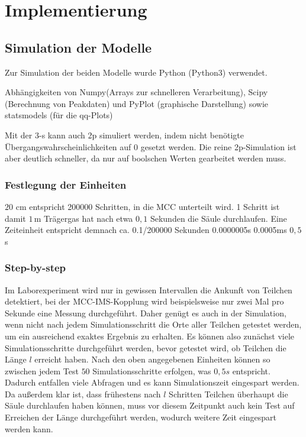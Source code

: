 
\chapter{Implementierung}
\label{chapter:imp}

\section{Simulation der Modelle}
Zur Simulation der beiden Modelle wurde Python (Python3) verwendet.

Abhängigkeiten von Numpy(Arrays zur schnelleren Verarbeitung), Scipy (Berechnung von Peakdaten) und PyPlot (graphische Darstellung) sowie statsmodels (für die qq-Plots)

Mit der 3-s kann auch 2p simuliert werden, indem nicht benötigte Übergangswahrscheinlichkeiten auf 0 gesetzt werden. Die reine 2p-Simulation ist aber deutlich schneller, da nur auf boolschen Werten gearbeitet werden muss.

\subsection{Festlegung der Einheiten}
$20$ cm entspricht 200000 Schritten, in die MCC unterteilt wird.
1 Schritt ist damit $1$\,\textmu m
Trägergas hat nach etwa $0,1$ Sekunden die Säule durchlaufen.
Eine Zeiteinheit entspricht demnach ca. 0.1/200000 Sekunden 0.0000005s 0.0005ms $0,5$\,\textmu s


\subsection{Step-by-step}

Im Laborexperiment wird nur in gewissen Intervallen die Ankunft von Teilchen detektiert, bei der MCC-IMS-Kopplung wird beispielsweise nur zwei Mal pro Sekunde eine Messung durchgeführt. Daher genügt es auch in der Simulation, wenn nicht nach jedem Simulationsschritt die Orte aller Teilchen getestet werden, um ein ausreichend exaktes Ergebnis zu erhalten.
Es können also zunächst viele Simulationsschritte durchgeführt werden, bevor getestet wird, ob Teilchen die Länge $l$ erreicht haben. Nach den oben angegebenen Einheiten können so zwischen jedem Test $50$ Simulationsschritte erfolgen, was $0,5 s$ entspricht. Dadurch entfallen viele Abfragen und es kann Simulationszeit eingespart werden. 
Da außerdem klar ist, dass frühestens nach $l$ Schritten Teilchen überhaupt die Säule durchlaufen haben können, muss vor diesem Zeitpunkt auch kein Test auf Erreichen der Länge durchgeführt werden, wodurch weitere Zeit eingespart werden kann.

